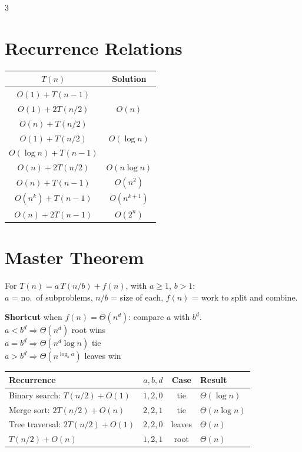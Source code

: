 \documentclass[9pt,landscape]{extarticle}
\begin{document}
\begin{multicols*}{3}
\section*{Recurrence Relations}
{\small
\begin{tabular}{@{}cc@{}}
\toprule
$T(n)$ & Solution \\
\midrule
$O(1) + T(n-1)$ & \\
$O(1) + 2T(n/2)$ & $O(n)$ \\
$O(n) + T(n/2)$ & \\
\rowcolor{rowgray} $O(1) + T(n/2)$ & $O(\log n)$ \\
$O(\log n) + T(n-1)$ & \\
$O(n) + 2T(n/2)$ & \multirow{-2}{*}{$O(n \log n)$} \\
\rowcolor{rowgray} $O(n) + T(n-1)$ & $O(n^2)$ \\
$O(n^k) + T(n-1)$ & $O(n^{k+1})$ \\
\rowcolor{rowgray} $O(n) + 2T(n-1)$ & $O(2^n)$ \\
\bottomrule
\end{tabular}}

\section*{Master Theorem}
For $T(n) = a\,T(n/b) + f(n)$, with $a \ge 1$, $b > 1$:\\
$a$ = no.\ of subproblems, $n/b$ = size of each, $f(n)$ = work to split and combine.

\textbf{Shortcut} when $f(n) = \Theta(n^d)$: compare $a$ with $b^d$.\\
$a < b^d \Rightarrow \Theta(n^d)$ \hfill root wins\\
$a = b^d \Rightarrow \Theta(n^d \log n)$ \hfill tie\\
$a > b^d \Rightarrow \Theta(n^{\log_b a})$ \hfill leaves win

{\small
\begin{tabular}{@{}lccl@{}}
\toprule
Recurrence & $a,b,d$ & Case & Result \\
\midrule
Binary search: $T(n/2) + O(1)$ & $1,2,0$ & tie & $\Theta(\log n)$ \\
\rowcolor{rowgray} Merge sort: $2T(n/2) + O(n)$ & $2,2,1$ & tie & $\Theta(n\log n)$ \\
Tree traversal: $2T(n/2) + O(1)$ & $2,2,0$ & leaves & $\Theta(n)$ \\
\rowcolor{rowgray} $T(n/2) + O(n)$ & $1,2,1$ & root & $\Theta(n)$ \\
\bottomrule
\end{tabular}}


\end{multicols*}
\end{document}
